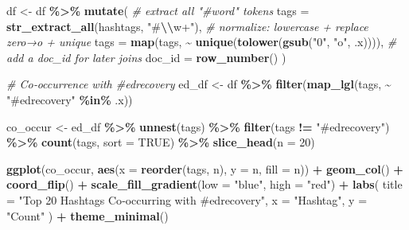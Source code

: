 \documentclass[
]{article}
\newenvironment{Shaded}{\begin{snugshade}}{\end{snugshade}}
\newcommand{\AttributeTok}[1]{\textcolor[rgb]{0.13,0.29,0.53}{#1}}
\newcommand{\CommentTok}[1]{\textcolor[rgb]{0.56,0.35,0.01}{\textit{#1}}}
\newcommand{\ConstantTok}[1]{\textcolor[rgb]{0.56,0.35,0.01}{#1}}
\newcommand{\DecValTok}[1]{\textcolor[rgb]{0.00,0.00,0.81}{#1}}
\newcommand{\FunctionTok}[1]{\textcolor[rgb]{0.13,0.29,0.53}{\textbf{#1}}}
\newcommand{\NormalTok}[1]{#1}
\newcommand{\OtherTok}[1]{\textcolor[rgb]{0.56,0.35,0.01}{#1}}
\newcommand{\SpecialCharTok}[1]{\textcolor[rgb]{0.81,0.36,0.00}{\textbf{#1}}}
\newcommand{\StringTok}[1]{\textcolor[rgb]{0.31,0.60,0.02}{#1}}
\begin{document}
\begin{Shaded}
\begin{Highlighting}[]
\NormalTok{df }\OtherTok{\textless{}{-}}\NormalTok{ df }\SpecialCharTok{\%\textgreater{}\%}
  \FunctionTok{mutate}\NormalTok{(}
    \CommentTok{\# extract all "\#word" tokens}
    \AttributeTok{tags =} \FunctionTok{str\_extract\_all}\NormalTok{(hashtags, }\StringTok{"\#}\SpecialCharTok{\textbackslash{}\textbackslash{}}\StringTok{w+"}\NormalTok{),}
    \CommentTok{\# normalize: lowercase + replace zero→o + unique}
    \AttributeTok{tags =} \FunctionTok{map}\NormalTok{(tags, }\SpecialCharTok{\textasciitilde{}} \FunctionTok{unique}\NormalTok{(}\FunctionTok{tolower}\NormalTok{(}\FunctionTok{gsub}\NormalTok{(}\StringTok{"0"}\NormalTok{, }\StringTok{"o"}\NormalTok{, .x)))),}
    \CommentTok{\# add a doc\_id for later joins}
    \AttributeTok{doc\_id =} \FunctionTok{row\_number}\NormalTok{()}
\NormalTok{  )}

\CommentTok{\# Co‑occurrence with \#edrecovery}
\NormalTok{ed\_df }\OtherTok{\textless{}{-}}\NormalTok{ df }\SpecialCharTok{\%\textgreater{}\%} 
  \FunctionTok{filter}\NormalTok{(}\FunctionTok{map\_lgl}\NormalTok{(tags, }\SpecialCharTok{\textasciitilde{}} \StringTok{"\#edrecovery"} \SpecialCharTok{\%in\%}\NormalTok{ .x))}

\NormalTok{co\_occur }\OtherTok{\textless{}{-}}\NormalTok{ ed\_df }\SpecialCharTok{\%\textgreater{}\%}
  \FunctionTok{unnest}\NormalTok{(tags) }\SpecialCharTok{\%\textgreater{}\%} 
  \FunctionTok{filter}\NormalTok{(tags }\SpecialCharTok{!=} \StringTok{"\#edrecovery"}\NormalTok{) }\SpecialCharTok{\%\textgreater{}\%}
  \FunctionTok{count}\NormalTok{(tags, }\AttributeTok{sort =} \ConstantTok{TRUE}\NormalTok{) }\SpecialCharTok{\%\textgreater{}\%}
  \FunctionTok{slice\_head}\NormalTok{(}\AttributeTok{n =} \DecValTok{20}\NormalTok{)}

\FunctionTok{ggplot}\NormalTok{(co\_occur, }\FunctionTok{aes}\NormalTok{(}\AttributeTok{x =} \FunctionTok{reorder}\NormalTok{(tags, n), }\AttributeTok{y =}\NormalTok{ n, }\AttributeTok{fill =}\NormalTok{ n)) }\SpecialCharTok{+}
  \FunctionTok{geom\_col}\NormalTok{() }\SpecialCharTok{+}
  \FunctionTok{coord\_flip}\NormalTok{() }\SpecialCharTok{+}
  \FunctionTok{scale\_fill\_gradient}\NormalTok{(}\AttributeTok{low =} \StringTok{"blue"}\NormalTok{, }\AttributeTok{high =} \StringTok{"red"}\NormalTok{) }\SpecialCharTok{+}
  \FunctionTok{labs}\NormalTok{(}
    \AttributeTok{title =} \StringTok{"Top 20 Hashtags Co‑occurring with \#edrecovery"}\NormalTok{,}
    \AttributeTok{x =} \StringTok{"Hashtag"}\NormalTok{, }\AttributeTok{y =} \StringTok{"Count"}
\NormalTok{  ) }\SpecialCharTok{+}
  \FunctionTok{theme\_minimal}\NormalTok{()}
\end{Highlighting}
\end{Shaded}
\end{document}

